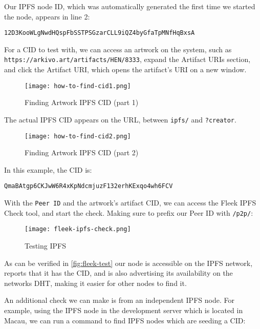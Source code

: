 Our IPFS node ID, which was automatically generated the first time we started the node, appears in line 2:
\begin{center}
\texttt{12D3KooWLgNwdHQspFbSSTPSGzarCLL9iQZ4byGfaTpMNfHqBxsA}
\end{center}
For a CID to test with, we can access an artwork on the system, such as\\ \texttt{https://arkivo.art/artifacts/HEN/8333}, expand the Artifact URIs section, and click the Artifact URI, which opens the artifact's URI on a new window.

\begin{figure}[H]
    \centering
    \texttt{[image: how-to-find-cid1.png]}
    \caption[Finding Artwork IPFS CID (part 1)]{Finding Artwork IPFS CID (part 1)}
    \label{fig:find-cid-1}
\end{figure}

The actual IPFS CID appears on the URL, between \texttt{ipfs/} and \texttt{?creator}.

\begin{figure}[H]
    \centering
    \texttt{[image: how-to-find-cid2.png]}
    \caption[Finding Artwork IPFS CID (part 2)]{Finding Artwork IPFS CID (part 2)}
    \label{fig:find-cid-1}
\end{figure}

In this example, the CID is:
\begin{center}
\texttt{QmaBAtgp6CKJwW6R4xKpNdcmjuzF132erhKExqo4wh6FCV}
\end{center}

With the \texttt{Peer ID} and the artwork's artifact CID, we can access the Fleek IPFS Check tool, and start the check. Making sure to prefix our Peer ID with \texttt{/p2p/}:

\begin{figure}[H]
    \centering
    \texttt{[image: fleek-ipfs-check.png]}
    \caption[Testing IPFS]{Testing IPFS}
    \label{fig:fleek-test}
\end{figure}

As can be verified in \autoref{fig:fleek-test} our node is accessible on the IPFS network, reports that it has the CID, and is also advertising its availability on the networks DHT, making it easier for other nodes to find it.

An additional check we can make is from an independent IPFS node. For example, using the IPFS node in the development server which is located in Macau, we can run a command to find IPFS nodes which are seeding a CID:

